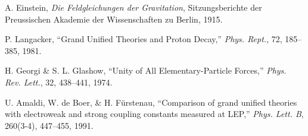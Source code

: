 \documentclass[12pt]{article}
\begin{document}
\begin{thebibliography}{9}

A. Einstein,
\textit{Die Feldgleichungen der Gravitation},
Sitzungsberichte der Preussischen Akademie der Wissenschaften zu Berlin, 1915.

P. Langacker,
``Grand Unified Theories and Proton Decay,''
\textit{Phys. Rept.}, 72, 185--385, 1981.

H. Georgi \& S. L. Glashow,
``Unity of All Elementary-Particle Forces,''
\textit{Phys. Rev. Lett.}, 32, 438--441, 1974.

U. Amaldi, W. de Boer, \& H. F\"urstenau,
``Comparison of grand unified theories with electroweak and strong coupling constants measured at LEP,''
\textit{Phys. Lett. B}, 260(3-4), 447--455, 1991.

\end{thebibliography}
\end{document}
